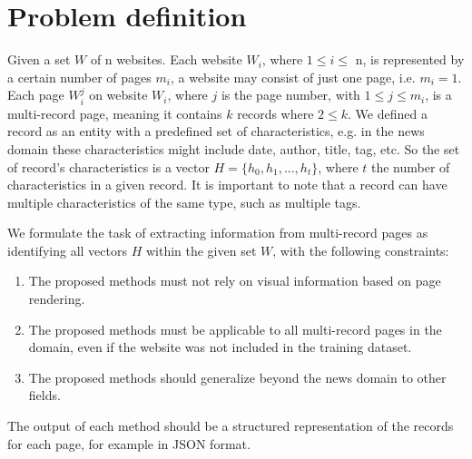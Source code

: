 \section{Problem definition}
Given a set $W$ of n websites. Each website $W_i$, where $1 \leq i \leq$ n, is represented by a certain number of pages $m_i$, a website may consist of just one page, i.e. $m_i = 1$. 
Each page $W_i^j$ on website $W_i$, where $j$ is the page number, with $1 \leq j \leq m_i$, is a multi-record page, meaning it contains $k$ records where $2 \leq k$. 
We defined a record as an entity with a predefined set of characteristics, e.g. in the news domain these characteristics might include date, author, title, tag, etc. So the set of record's characteristics is a vector $H = \{h_0, h_1, ..., h_t\}$, where $t$ the number of characteristics in a given record. It is important to note that a record can have multiple characteristics of the same type, such as multiple tags.

We formulate the task of extracting information from multi-record pages as identifying all vectors $H$ within the given set $W$, with the following constraints:
\begin{enumerate}
  \item The proposed methods must not rely on visual information based on page rendering.
  \item The proposed methods must be applicable to all multi-record pages in the domain, even if the website was not included in the training dataset.
  \item The proposed methods should generalize beyond the news domain to other fields.
\end{enumerate}

The output of each method should be a structured representation of the records for each page, for example in JSON format.

